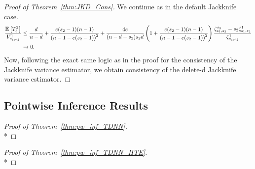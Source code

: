 \begin{proof}[Proof of Theorem~\ref{thm:JKD_Cons}]
	We continue as in the default Jackknife case.
	\begin{equation}
		\begin{aligned}
			\frac{\mathbb{E}\left[T_{\ell}^2\right]}{V_{s_1, s_2}^{1}}
			 & \leq \frac{d}{n - d} + \frac{e (s_2 - 1)(n - 1)}{\left(n - 1 - e (s_2 - 1)\right)^2}
			+ \frac{4e}{(n - d - s_2)s_2 d}\left(1 + \frac{e (s_2 - 1)(n - 1)}{\left(n - 1 - e (s_2 - 1)\right)^2}\right) \frac{\zeta_{s_1, s_2}^{s_2} - s_2 \zeta_{s_1, s_2}^{1}}{\zeta_{s_1, s_2}^{1}} \\
			 & \rightarrow 0.
		\end{aligned}
	\end{equation}
	Now, following the exact same logic as in the proof for the consistency of the Jackknife variance estimator, we obtain consistency of the delete-d Jackknife variance estimator.
\end{proof}

\newpage
\subsection{Pointwise Inference Results}

\begin{proof}[Proof of Theorem~\ref{thm:pw_inf_TDNN}]\mbox{}\\*

\end{proof}

\begin{proof}[Proof of Theorem~\ref{thm:pw_inf_TDNN_HTE}]\mbox{}\\*

\end{proof}
